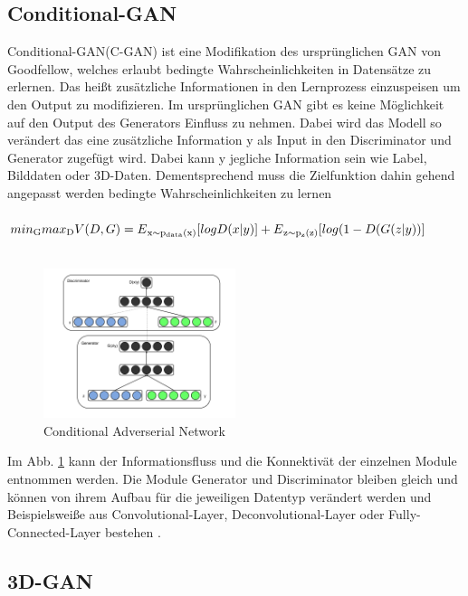 \documentclass{llncs}
\begin{document}
\subsection{Conditional-GAN}\label{sec:cgan}

Conditional-GAN(C-GAN) ist eine Modifikation des ursprünglichen GAN von Goodfellow, welches erlaubt bedingte Wahrscheinlichkeiten in Datensätze zu erlernen. Das heißt zusätzliche Informationen in den Lernprozess einzuspeisen um den Output zu modifizieren. Im ursprünglichen GAN gibt es keine Möglichkeit auf den Output des Generators Einfluss zu nehmen. Dabei wird das Modell so verändert das eine zusätzliche Information y als Input in den Discriminator und Generator zugefügt wird. Dabei kann y jegliche Information sein wie Label, Bilddaten oder 3D-Daten. Dementsprechend muss die Zielfunktion dahin gehend angepasst werden bedingte Wahrscheinlichkeiten zu lernen
\\\\
\begin{math}
min\textsubscript{G} max\textsubscript{D}V(D,G)=E\textsubscript{x$\sim$p\textsubscript{data}(x)}[logD(x|y)]  + E\textsubscript{z$\sim$p\textsubscript{z}(z)}[log(1-D(G(z|y))]          
\end{math}
\\\\
\begin{figure}[htbp] 
	\centering
	\includegraphics[width=0.5\textwidth]{cgan.png}
	\caption{Conditional Adverserial Network\protect\cite{cgan}}
	\label{fig:Bild38}
\end{figure}
Im Abb. \ref{fig:Bild38} kann der Informationsfluss und die Konnektivät der einzelnen Module entnommen werden. Die Module Generator und Discriminator bleiben gleich und können von ihrem Aufbau für die jeweiligen Datentyp verändert werden und Beispielsweiße aus Convolutional-Layer, Deconvolutional-Layer oder Fully-Connected-Layer bestehen \cite{cgan}.
\newpage
\subsection{3D-GAN}\label{sec:3dgan}
\end{document}
